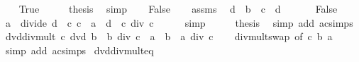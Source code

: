 \begin{isabellebody}
\ \ \isamarkupfalse%
\ True\isanewline
\ \ \isamarkupfalse%
\ \isamarkupfalse%
\ {\isacharquery}{\kern0pt}thesis\ \isamarkupfalse%
\ simp\isanewline
{}\isamarkupfalse%
\isanewline
\ \ \isamarkupfalse%
\ False\isanewline
\ \ \isamarkupfalse%
\ assms\ \isamarkupfalse%
\ d\ \ {\isachardoublequoteopen}b\ {\isacharequal}{\kern0pt}\ c\ {\isacharasterisk}{\kern0pt}\ d{\isachardoublequoteclose}\ \isacommand{{\isachardot}{\kern0pt}{\isachardot}{\kern0pt}}\isamarkupfalse%
\isanewline
\ \ \isamarkupfalse%
\ \isamarkupfalse%
\ False\ \isamarkupfalse%
\ {\isachardoublequoteopen}a\ {\isacharasterisk}{\kern0pt}\ divide\ {\isacharparenleft}{\kern0pt}d\ {\isacharasterisk}{\kern0pt}\ c{\isacharparenright}{\kern0pt}\ c\ {\isacharequal}{\kern0pt}\ {\isacharparenleft}{\kern0pt}{\isacharparenleft}{\kern0pt}a\ {\isacharasterisk}{\kern0pt}\ d{\isacharparenright}{\kern0pt}\ {\isacharasterisk}{\kern0pt}\ c{\isacharparenright}{\kern0pt}\ div\ c{\isachardoublequoteclose}\isanewline
\ \ \ \ \isamarkupfalse%
\ simp\isanewline
\ \ \isamarkupfalse%
\ \isamarkupfalse%
\ {\isacharquery}{\kern0pt}thesis\ \isamarkupfalse%
\ {\isacharparenleft}{\kern0pt}simp\ add{\isacharcolon}{\kern0pt}\ ac{\isacharunderscore}{\kern0pt}simps{\isacharparenright}{\kern0pt}\isanewline
{}\isamarkupfalse%
%
\endisatagproof
{\isafoldproof}%
%
\isadelimproof
\isanewline
%
\endisadelimproof
\isanewline
{}\isamarkupfalse%
\ dvd{\isacharunderscore}{\kern0pt}div{\isacharunderscore}{\kern0pt}mult{\isacharcolon}{\kern0pt}\ {\isachardoublequoteopen}c\ dvd\ b\ {\isasymLongrightarrow}\ b\ div\ c\ {\isacharasterisk}{\kern0pt}\ a\ {\isacharequal}{\kern0pt}\ {\isacharparenleft}{\kern0pt}b\ {\isacharasterisk}{\kern0pt}\ a{\isacharparenright}{\kern0pt}\ div\ c{\isachardoublequoteclose}\isanewline
%
\isadelimproof
\ \ %
\endisadelimproof
%
\isatagproof
{}\isamarkupfalse%
\ div{\isacharunderscore}{\kern0pt}mult{\isacharunderscore}{\kern0pt}swap\ {\isacharbrackleft}{\kern0pt}of\ c\ b\ a{\isacharbrackright}{\kern0pt}\ \isamarkupfalse%
\ {\isacharparenleft}{\kern0pt}simp\ add{\isacharcolon}{\kern0pt}\ ac{\isacharunderscore}{\kern0pt}simps{\isacharparenright}{\kern0pt}%
\endisatagproof
{\isafoldproof}%
%
\isadelimproof
\isanewline
%
\endisadelimproof
\isanewline
{}\isamarkupfalse%
\ dvd{\isacharunderscore}{\kern0pt}div{\isacharunderscore}{\kern0pt}mult{}{\isacharunderscore}{\kern0pt}eq{\isacharcolon}{\kern0pt}\isanewline

\end{isabellebody}
